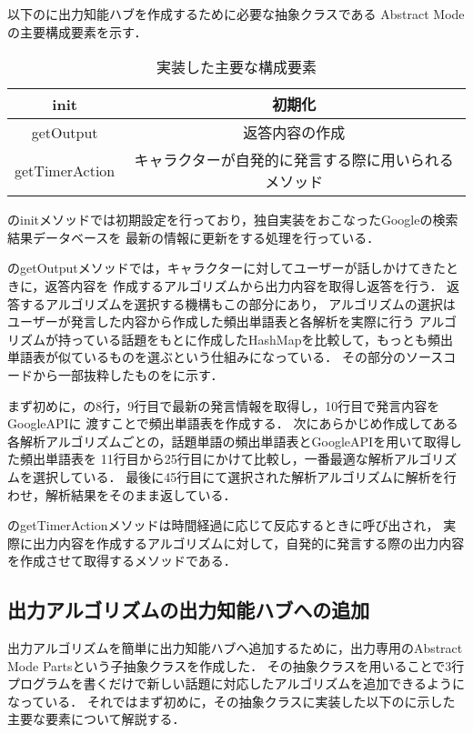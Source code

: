以下のに出力知能ハブを作成するために必要な抽象クラスである
Abstract Modeの主要構成要素を示す．\\

\begin{table}[tbh]
	\caption{実装した主要な構成要素} \label{tab:abstractmode}
	\begin{center}
		\begin{tabular}[htb]{c|c}
		\hline
		init & 初期化 \\
		\hline
		getOutput & 返答内容の作成 \\
		\hline
		getTimerAction & キャラクターが自発的に発言する際に用いられるメソッド \\
		\hline
		\end{tabular}
	\end{center}
\end{table}

のinitメソッドでは初期設定を行っており，独自実装をおこなったGoogleの検索結果データベースを
最新の情報に更新をする処理を行っている．

のgetOutputメソッドでは，キャラクターに対してユーザーが話しかけてきたときに，返答内容を
作成するアルゴリズムから出力内容を取得し返答を行う．
返答するアルゴリズムを選択する機構もこの部分にあり，
アルゴリズムの選択はユーザーが発言した内容から作成した頻出単語表と各解析を実際に行う
アルゴリズムが持っている話題をもとに作成したHashMapを比較して，もっとも頻出単語表が似ているものを選ぶという仕組みになっている．
その部分のソースコードから一部抜粋したものをに示す．


まず初めに，の8行，9行目で最新の発言情報を取得し，10行目で発言内容をGoogleAPIに
渡すことで頻出単語表を作成する．
次にあらかじめ作成してある各解析アルゴリズムごとの，話題単語の頻出単語表とGoogleAPIを用いて取得した頻出単語表を
11行目から25行目にかけて比較し，一番最適な解析アルゴリズムを選択している．
最後に45行目にて選択された解析アルゴリズムに解析を行わせ，解析結果をそのまま返している．

のgetTimerActionメソッドは時間経過に応じて反応するときに呼び出され，
実際に出力内容を作成するアルゴリズムに対して，自発的に発言する際の出力内容を作成させて取得するメソッドである．

\subsection{出力アルゴリズムの出力知能ハブへの追加}
出力アルゴリズムを簡単に出力知能ハブへ追加するために，出力専用のAbstract Mode Partsという子抽象クラスを作成した．
その抽象クラスを用いることで3行プログラムを書くだけで新しい話題に対応したアルゴリズムを追加できるようになっている．
それではまず初めに，その抽象クラスに実装した以下のに示した主要な要素について解説する．

